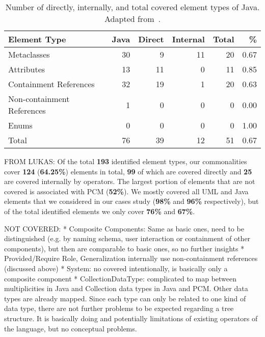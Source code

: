\begin{table}[htb]
	\centering
		\begin{tabular}{lrrrrr}
			\toprule
			\multicolumn{1}{l}{\bfseries Element Type} & \multicolumn{1}{r}{\bfseries Java} & \multicolumn{1}{r}{\bfseries Direct} & \multicolumn{1}{r}{\bfseries Internal} & \multicolumn{1}{r}{\bfseries Total} & \multicolumn{1}{r}{\bfseries \%}\\
			\midrule
			Metaclasses 				& 30	& 9		& 11	& 20	& 0.67	\\
			Attributes 					& 13	& 11	& 0		& 11	& 0.85	\\
			Containment References 		& 32	& 19	& 1		& 20	& 0.63	\\
			Non-containment References 	& 1		& 0		& 0		& 0		& 0.00	\\
			Enums 						& 0		& 0		& 0		& 0		& 1.00	\\
			\midrule
			Total 						& 76	& 39	& 12	& 51	& 0.67	\\
			\bottomrule
		\end{tabular}
	\caption{Number of directly, internally, and total covered element types of Java. Adapted from~\cite[Table 10.5]{hennig2020ma}.}
	\label{tab:commonalities_evaluation:coverage_java}
\end{table}

FROM LUKAS: 
Of the total \textbf{193} identified element types, our commonalities cover \textbf{124} (\textbf{64.25\%}) elements in total, \textbf{99} of which are covered directly and \textbf{25} are covered internally by operators. The largest portion of elements that are not covered is associated with PCM (\textbf{52\%}). We mostly covered all UML and Java elements that we considered in our cases study (\textbf{98\%} and \textbf{96\%} respectively), but of the total identified elements we only cover \textbf{76\%} and \textbf{67\%}.


NOT COVERED:
* Composite Components: Same as basic ones, need to be distinguished (e.g. by naming schema, user interaction or containment of other components), but then are comparable to basic ones, so no further insights
* Provided/Require Role, Generalization internally use non-containment references (discussed above)
* System: no covered intentionally, is basically only a composite component
* CollectionDataType: complicated to map between multiplicities in Java and Collection data types in Java and PCM. Other data types are already mapped. Since each type can only be related to one kind of data type, there are not further problems to be expected regarding a tree structure. It is basically doing and potentially limitations of existing operators of the language, but no conceptual problems.


